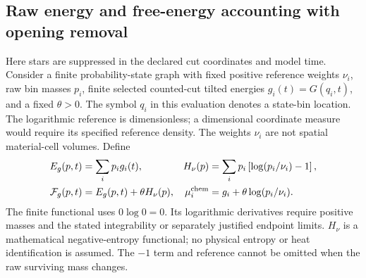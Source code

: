\documentclass[11pt]{article}
\begin{document}
\subsection{Raw energy and free-energy accounting with opening removal}
Here stars are suppressed in the declared cut coordinates and model time.
Consider a finite probability-state graph with fixed positive reference
weights $\nu_i$, raw bin masses $p_i$, finite selected counted-cut tilted energies
$g_i(t)=G(q_i,t)$, and a fixed $\theta>0$. The symbol $q_i$ in this evaluation
denotes a state-bin location. The logarithmic reference is dimensionless;
a dimensional coordinate measure would require its specified reference density.
The weights $\nu_i$ are not spatial material-cell volumes. Define
\begin{align}
 E_g(p,t)&=\sum_i p_i g_i(t),&
 H_\nu(p)&=\sum_i p_i\left[\log(p_i/\nu_i)-1\right],\nonumber\\
 \mathcal F_g(p,t)&=E_g(p,t)+\theta H_\nu(p),&
 \mu_i^{\rm chem}&=g_i+\theta\log(p_i/\nu_i).
 \label{eq:r09-raw-functional}
\end{align}
The finite functional uses $0\log0=0$. Its logarithmic derivatives require
positive masses and the stated integrability or separately justified endpoint
limits. $H_\nu$ is a mathematical negative-entropy functional; no physical
entropy or heat identification is assumed. The $-1$ term and reference cannot
be omitted when the raw surviving mass changes.
\end{document}
